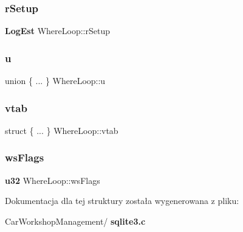 \subsubsection{rSetup}
{\footnotesize\ttfamily \textbf{ Log\+Est} Where\+Loop\+::r\+Setup}

\mbox{\label{struct_where_loop_a7f2f2b4e665994984892460a5cdbe38d}} 
\subsubsection{u}
{\footnotesize\ttfamily union \{ ... \}   Where\+Loop\+::u}

\mbox{\label{struct_where_loop_a70928916aa62d952f1fb839b8ce390bd}} 
\subsubsection{vtab}
{\footnotesize\ttfamily struct \{ ... \}   Where\+Loop\+::vtab}

\mbox{\label{struct_where_loop_a0cd1e9719a060631a647738bead23b8c}} 
\subsubsection{wsFlags}
{\footnotesize\ttfamily \textbf{ u32} Where\+Loop\+::ws\+Flags}



Dokumentacja dla tej struktury została wygenerowana z pliku\+:\begin{DoxyCompactItemize}
\item 
Car\+Workshop\+Management/\textbf{ sqlite3.\+c}\end{DoxyCompactItemize}
